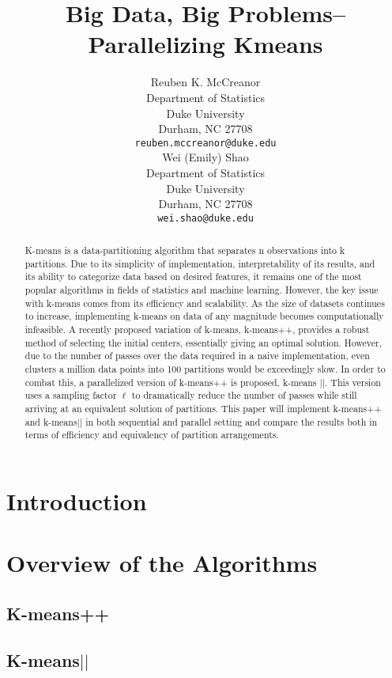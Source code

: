 \documentclass{article} %
\title{Big Data, Big Problems--Parallelizing Kmeans}
\author{
Reuben K. McCreanor \\
Department of Statistics\\
Duke University\\
Durham, NC 27708 \\
\texttt{reuben.mccreanor@duke.edu} \\
\And
Wei (Emily) Shao\\
Department of Statistics\\
Duke University\\
Durham, NC 27708 \\
\texttt{wei.shao@duke.edu} \\
}
\begin{document}
\maketitle

\begin{abstract}
K-means is a data-partitioning algorithm that separates n observations into k partitions. Due to its simplicity of implementation, interpretability of its results, and its ability to categorize data based on desired features, it remains one of the most popular algorithms in fields of statistics and machine learning. However, the key issue with k-means comes from its efficiency and scalability. As the size of datasets continues to increase, implementing k-means on data of any magnitude becomes computationally infeasible. A recently proposed variation of k-means, k-means++, provides a robust method of selecting the initial centers, essentially giving an optimal solution. However, due to the number of passes over the data required in a naive  implementation, even clusters a million data points into 100 partitions would be exceedingly slow. In order to combat this, a parallelized version of k-means++ is proposed, k-means $||$. This version uses a sampling factor $\ell$ to dramatically reduce the number of passes while still arriving at an equivalent solution of partitions. This paper will implement k-means++ and k-means$||$ in both sequential and parallel setting and compare the results both in terms of efficiency and equivalency of partition arrangements.
 
\end{abstract}

\clearpage
\newpage

\section{Introduction}
\label{headings}

\section{Overview of the Algorithms}
\label{headings}

\subsection{K-means++}

\subsection{K-means$||$}
\end{document}
